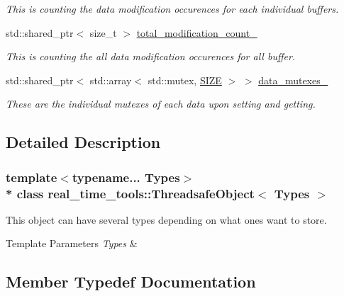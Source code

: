 \begin{DoxyCompactItemize}
\begin{DoxyCompactList}\small\item\em This is counting the data modification occurences for each individual buffers. \end{DoxyCompactList}\item 
std\+::shared\+\_\+ptr$<$ size\+\_\+t $>$ \hyperlink{classreal__time__tools_1_1ThreadsafeObject_a12f866f5a2f955aa3b55b03623033fca}{total\+\_\+modification\+\_\+count\+\_\+}
\begin{DoxyCompactList}\small\item\em This is counting the all data modification occurences for all buffer. \end{DoxyCompactList}\item 
std\+::shared\+\_\+ptr$<$ std\+::array$<$ std\+::mutex, \hyperlink{classreal__time__tools_1_1ThreadsafeObject_af05c02b66f0b75ea12cde9274bc2a97d}{S\+I\+ZE} $>$ $>$ \hyperlink{classreal__time__tools_1_1ThreadsafeObject_a8a4e122257d25cf42a389c56daf41cb7}{data\+\_\+mutexes\+\_\+}\hypertarget{classreal__time__tools_1_1ThreadsafeObject_a8a4e122257d25cf42a389c56daf41cb7}{}\label{classreal__time__tools_1_1ThreadsafeObject_a8a4e122257d25cf42a389c56daf41cb7}

\begin{DoxyCompactList}\small\item\em These are the individual mutexes of each data upon setting and getting. \end{DoxyCompactList}\end{DoxyCompactItemize}


\subsection{Detailed Description}
\subsubsection*{template$<$typename... Types$>$\\*
class real\+\_\+time\+\_\+tools\+::\+Threadsafe\+Object$<$ Types $>$}

This object can have several types depending on what ones want to store. 


\begin{DoxyTemplParams}{Template Parameters}
{\em Types} & \\
\hline
\end{DoxyTemplParams}


\subsection{Member Typedef Documentation}
